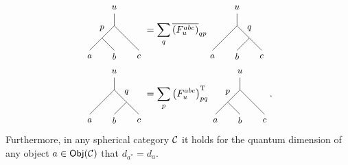 	\begin{align}
		\begin{tikzpicture}[baseline=(current bounding box.center),yscale=-0.9,xscale=0.9]
			\draw (0,0.5) -- (0,1);
			\draw (0,1) -- (-0.5,1.5);
			\draw (-0.5,1.5) -- (-1,2);
			\draw (-0.5,1.5) -- (0,2);
			\draw (0,1) -- (0.5,1.5);
			\draw (0.5,1.5) -- (1,2);
			\node at (0,0.25) {\small $u$};
			\node at (-1,2.25) {\small $a$};
			\node at (0,2.25) {\small $b$};
			\node at (1,2.25) {\small $c$};
			\node at (-0.5,1.1) {\small $p$};
		\end{tikzpicture}&=\sum_q \overline{\left(F_u^{abc}\right)}_{qp}
		\begin{tikzpicture}[baseline=(current bounding box.center),yscale=-0.9,xscale=0.9]
			\draw (0,0.5) -- (0,1);
			\draw (0,1) -- (-0.5,1.5);
			\draw (-0.5,1.5) -- (-1,2);
			\draw (0.5,1.5) -- (0,2);
			\draw (0,1) -- (0.5,1.5);
			\draw (0.5,1.5) -- (1,2);
			\node at (0,0.25) {\small $u$};
			\node at (-1,2.25) {\small $a$};
			\node at (0,2.25) {\small $b$};
			\node at (1,2.25) {\small $c$};
			\node at (0.5,1.1) {\small $q$};
		\end{tikzpicture}\\
		\begin{tikzpicture}[baseline=(current bounding box.center),yscale=-0.9,xscale=0.9]
			\draw (0,0.5) -- (0,1);
			\draw (0,1) -- (-0.5,1.5);
			\draw (-0.5,1.5) -- (-1,2);
			\draw (0.5,1.5) -- (0,2);
			\draw (0,1) -- (0.5,1.5);
			\draw (0.5,1.5) -- (1,2);
			\node at (0,0.25) {\small $u$};
			\node at (-1,2.25) {\small $a$};
			\node at (0,2.25) {\small $b$};
			\node at (1,2.25) {\small $c$};
			\node at (0.5,1.1) {\small $q$};
		\end{tikzpicture}&=\sum_p \left(F_u^{abc}\right)_{pq}^\mathrm{T}
		\begin{tikzpicture}[baseline=(current bounding box.center),yscale=-0.9,xscale=0.9]
			\draw (0,0.5) -- (0,1);
			\draw (0,1) -- (-0.5,1.5);
			\draw (-0.5,1.5) -- (-1,2);
			\draw (-0.5,1.5) -- (0,2);
			\draw (0,1) -- (0.5,1.5);
			\draw (0.5,1.5) -- (1,2);
			\node at (0,0.25) {\small $u$};
			\node at (-1,2.25) {\small $a$};
			\node at (0,2.25) {\small $b$};
			\node at (1,2.25) {\small $c$};
			\node at (-0.5,1.1) {\small $p$};
		\end{tikzpicture}.
	\end{align}
Furthermore, in any spherical category ${\mathcal{C}}$ it holds for the quantum dimension of any object $a\in\mathsf{Obj}({\mathcal{C}})$ that $d_{a^*}=d_a$.

